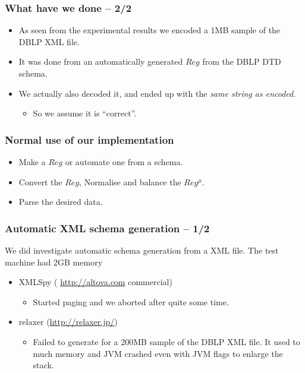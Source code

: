 \documentclass[slidestop,compress,mathserif, xcolor=table]{beamer}
\begin{document}
\begin{frame}[c]
  \frametitle{What have we done -- 2/2}
  \begin{itemize}

  \item As seen from the experimental results we encoded a 1MB sample of the
    DBLP XML file.


  \item It was done from an automatically generated $Reg$ from the DBLP DTD schema.

  \item We actually also decoded it, and ended up with the
    \emph{same string as encoded}.
    
    \begin{itemize}
    \item So we assume it is ``correct''.
    \end{itemize}

  \end{itemize}
\end{frame}

\begin{frame}[c]
  \frametitle{Normal use of our implementation}
  \begin{itemize}

  \item Make a $Reg$ or automate one from a schema.

  \item Convert the $Reg$, Normalise and balance the $Reg^\mu$.

  \item Parse the desired data.

  \end{itemize}
\end{frame}

\begin{frame}[c]
  \frametitle{Automatic XML schema generation -- 1/2}
  
  We did investigate automatic schema generation from a XML file. The test
  machine had 2GB memory

  \begin{itemize}
  \item XMLSpy ( \url{http://altova.com} commercial)
    \begin{itemize}
    \item Started paging and we aborted after quite some time.
    \end{itemize}

  \item relaxer (\url{http://relaxer.jp/})
    \begin{itemize}
    \item Failed to generate for a 200MB sample of the DBLP XML file. It
      used to much memory and JVM crashed even with JVM flags to enlarge the stack.
    \end{itemize}
  \end{itemize}

\end{frame}
\end{document}
